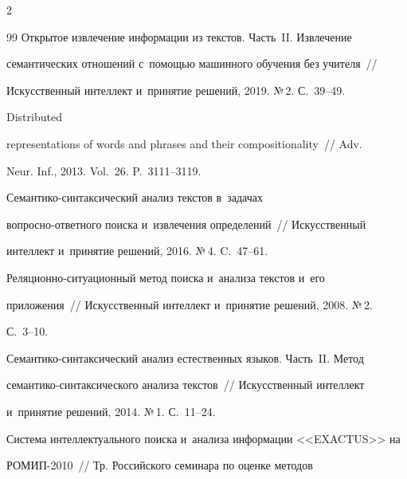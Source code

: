 \begin{multicols}{2}
{{\begin{thebibliography}{99}
Открытое извлечение информации из текстов. Часть~II. Извлечение 


семантических отношений с~помощью машинного обучения без учителя~// 


Искусственный интеллект и~принятие решений, 2019. №\,2. С.~39--49.




   Distributed 


representations of words and phrases and their compositionality~// Adv.


Neur. Inf., 2013. Vol.~26. P.~3111--3119.






Семантико-синтаксический анализ текстов в~задачах  


воп\-рос\-но-от\-вет\-но\-го поиска и~извлечения определений~// Искусственный 


интеллект и~принятие решений, 2016. №\,4. C.~47--61.






Ре\-ля\-ци\-он\-но-си\-ту\-а\-ци\-он\-ный метод поиска и~анализа текстов и~его 


приложения~// Искусственный интеллект и~принятие решений, 2008. №\,2. 


С.~3--10.






Семантико-синтаксический анализ естественных языков. Часть~II. Метод 


се\-ман\-ти\-ко-син\-так\-си\-че\-ско\-го анализа текстов~// Искусственный интеллект 


и~принятие решений, 2014. №\,1. С.~11--24.






Система интеллектуального поиска и~анализа информации <<EXACTUS>> на  


\mbox{РОМИП}-2010~// Тр. Российского семинара по оценке методов 



\end{thebibliography}}}
\end{multicols}
